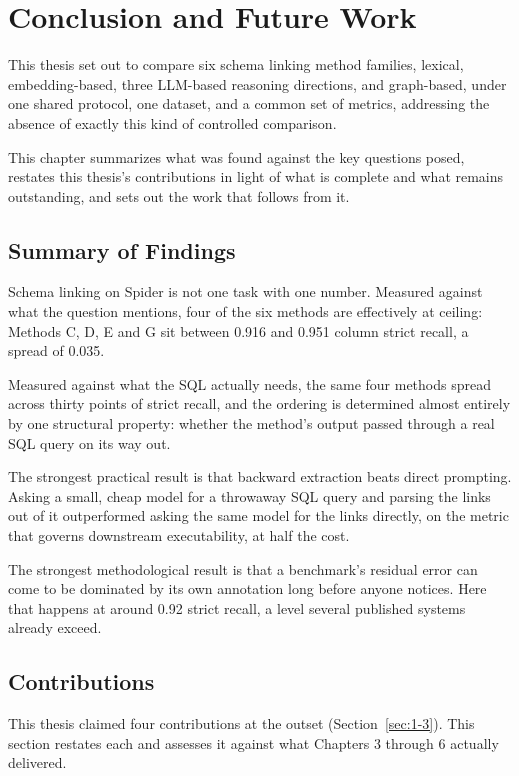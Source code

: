 \chapter{Conclusion and Future Work}\label{ch:7}

This thesis set out to compare six schema linking method families, lexical, embedding-based, three LLM-based reasoning directions, and graph-based, under one shared protocol, one dataset, and a common set of metrics, addressing the absence of exactly this kind of controlled comparison.

This chapter summarizes what was found against the key questions posed, restates this thesis's contributions in light of what is complete and what remains outstanding, and sets out the work that follows from it.

\section{Summary of Findings}\label{sec:7-1}

Schema linking on Spider is not one task with one number. Measured against what the question mentions, four of the six methods are effectively at ceiling: Methods C, D, E and G sit between 0.916 and 0.951 column strict recall, a spread of 0.035.

Measured against what the SQL actually needs, the same four methods spread across thirty points of strict recall, and the ordering is determined almost entirely by one structural property: whether the method's output passed through a real SQL query on its way out.

The strongest practical result is that backward extraction beats direct prompting. Asking a small, cheap model for a throwaway SQL query and parsing the links out of it outperformed asking the same model for the links directly, on the metric that governs downstream executability, at half the cost.

The strongest methodological result is that a benchmark's residual error can come to be dominated by its own annotation long before anyone notices. Here that happens at around 0.92 strict recall, a level several published systems already exceed.

\section{Contributions}\label{sec:7-2}

This thesis claimed four contributions at the outset (Section~\ref{sec:1-3}). This section restates each and assesses it against what Chapters 3 through 6 actually delivered.

